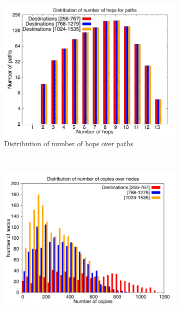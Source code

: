 \begin{figure}[!htbp]
        \centering
        \begin{subfigure}[b]{0.49\textwidth}
                \includegraphics[width=\textwidth]{report_figures/incrdist/2k/hop_histo.pdf}
                \caption{Distribution of number of hops over paths}
                \label{fig:incrdist_2k_hop}
        \end{subfigure}%
        ~ %
        \begin{subfigure}[b]{0.49\textwidth}
                \includegraphics[width=\textwidth]{report_figures/incrdist/2k/copy_histo.pdf}

\end{subfigure}
\end{figure}
